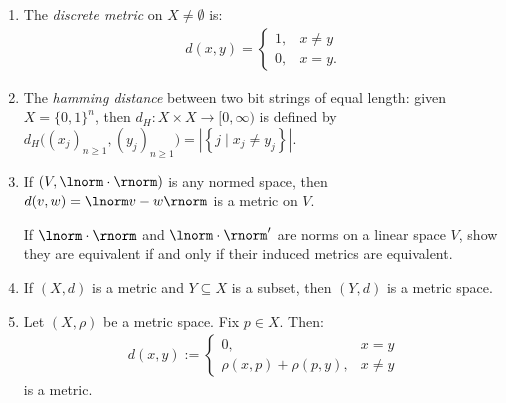     \begin{example}
        \phantom{a}
        \begin{enumerate}[label = (\arabic*),itemsep=1pt,topsep=3pt]
            \item The \textit{discrete metric} on $X \neq \emptyset$ is:
                \begin{equation*}
                \begin{split}
                    d(x,y) = \begin{cases}1, & x \neq y \\ 0, & x =y  .\end{cases}
                \end{split}
                \end{equation*}

            \item The \textit{hamming distance} between two bit strings of equal length: given $X = \{0,1\}^n$, then $d_H:X \times X \rightarrow [0,\infty)$ is defined by $d_H\bigl( (x_j)_{n \geq 1}, (y_j)_{n \geq 1}\bigr) = \left| \left\{ j \mid x_j \neq y_j \right\} \right|$.
            
            \item If $(V,\lnorm \cdot \rnorm)$ is any normed space, then $d(v,w) = \lnorm v -w  \rnorm$ is a metric on $V$.
                \begin{exercise}
                    If $\lnorm \cdot \rnorm$ and $\lnorm \cdot \rnorm'$ are norms on a linear space $V$, show they are equivalent if and only if their induced metrics are equivalent.
                \end{exercise}

            \item If $(X,d)$ is a metric and $Y \subseteq X$ is a subset, then $(Y,d)$ is a metric space.
            
            \item Let $(X,\rho)$ be a metric space. Fix $p \in X$. Then:
                \begin{equation*}
                \begin{split}
                    d(x,y) := \begin{cases} 0, &x=y \\ \rho(x,p) + \rho(p,y), & x \neq y \end{cases}
                \end{split}
                \end{equation*}
            is a metric.


\end{enumerate}
\end{example}
